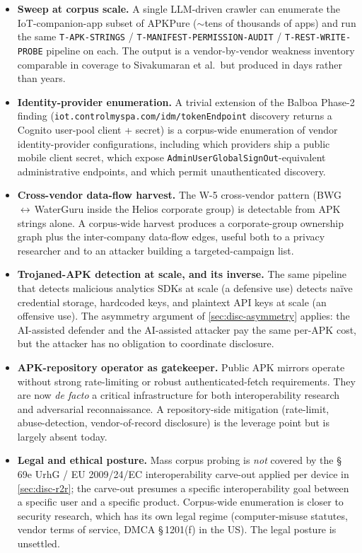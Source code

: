 \documentclass[11pt,a4paper]{article}
\begin{document}
\begin{itemize}
  \item \textbf{Sweep at corpus scale.} A single LLM-driven crawler
        can enumerate the IoT-companion-app subset of APKPure
        ($\sim$tens of thousands of apps) and run the same
        \texttt{T-APK-STRINGS} / \texttt{T-MANIFEST-PERMISSION-AUDIT} /
        \texttt{T-REST-WRITE-PROBE} pipeline on each. The output is a
        vendor-by-vendor weakness inventory comparable in coverage to
        Sivakumaran et al.\ but produced in days rather than years.
  \item \textbf{Identity-provider enumeration.} A trivial extension of
        the Balboa Phase-2 finding
        (\texttt{iot.controlmyspa.com/idm/tokenEndpoint} discovery
        returns a Cognito user-pool client + secret) is a corpus-wide
        enumeration of vendor identity-provider configurations,
        including which providers ship a public mobile client secret,
        which expose \texttt{AdminUserGlobalSignOut}-equivalent
        administrative endpoints, and which permit unauthenticated
        discovery.
  \item \textbf{Cross-vendor data-flow harvest.} The W-5 cross-vendor
        pattern (BWG\,$\leftrightarrow$\,WaterGuru inside the Helios
        corporate group) is detectable from APK strings alone. A
        corpus-wide harvest produces a corporate-group ownership graph
        plus the inter-company data-flow edges, useful both to a
        privacy researcher and to an attacker building a
        targeted-campaign list.
  \item \textbf{Trojaned-APK detection at scale, and its inverse.} The
        same pipeline that detects malicious analytics SDKs at scale
        (a defensive use) detects naïve credential storage, hardcoded
        keys, and plaintext API keys at scale (an offensive use). The
        asymmetry argument of \cref{sec:disc-asymmetry} applies: the
        AI-assisted defender and the AI-assisted attacker pay the same
        per-APK cost, but the attacker has no obligation to coordinate
        disclosure.
  \item \textbf{APK-repository operator as gatekeeper.} Public APK
        mirrors operate without strong rate-limiting or robust
        authenticated-fetch requirements. They are now \emph{de facto}
        a critical infrastructure for both interoperability research
        and adversarial reconnaissance. A repository-side mitigation
        (rate-limit, abuse-detection, vendor-of-record disclosure) is
        the leverage point but is largely absent today.
  \item \textbf{Legal and ethical posture.} Mass corpus probing is
        \emph{not} covered by the \S{}\,69e UrhG / EU 2009/24/EC
        interoperability carve-out applied per device in
        \cref{sec:disc-r2r}; the carve-out presumes a specific
        interoperability goal between a specific user and a specific
        product. Corpus-wide enumeration is closer to security
        research, which has its own legal regime (computer-misuse
        statutes, vendor terms of service, DMCA \S{}\,1201(f) in the
        US). The legal posture is unsettled.
\end{itemize}
\end{document}
